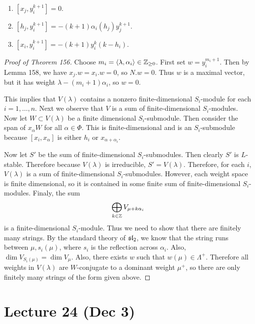 \documentclass[twoside, 10pt]{article}
\begin{document}
    \begin{lem} \begin{enumerate} \item $[x_j, y_i^{k+1}] = 0$.  \item $[h_j,
    y_i^{k+1}] = -(k+1) \alpha_i(h_j) y_j^{k+1}$.  \item $[x_i, y_i^{k+1}] =
    -(k+1) y_i^k(k-h_i)$.  \end{enumerate} \end{lem}

    \begin{proof}[Proof of Theorem 156] Choose $m_i = \langle\lambda, \alpha_i\rangle
        \in \mathbb{Z}_{\geq 0}$. First set $w = y_i^{m_i+1}$. Then by Lemma 158, we
        have $x_j.w = x_i.w = 0$, so $N.w = 0$. Thus $w$ is a maximal vector,
        but it has weight $\lambda - (m_i+1)\alpha_i$, so $w = 0$.

        This implies that $V(\lambda)$ contains a nonzero finite-dimensional
        $S_i$-module for each $i = 1, \ldots, n$. Next we observe that $V$ is a
        sum of finite-dimensional $S_i$-modules. Now let $W \subset V(\lambda)$
        be a finite dimensional $S_i$-submodule. Then consider the span of
        $x_{\alpha}W$ for all $\alpha \in \Phi$. This is finite-dimensional and
        is an $S_i$-submodule because $[x_i, x_{\alpha}]$ is either $h_i$ or
        $x_{\alpha+\alpha_i}$.

        Now let $S'$ be the sum of finite-dimensional $S_i$-submodules. Then
        clearly $S'$ is $L$-stable. Therefore because $V(\lambda)$ is
        irreducible, $S' = V(\lambda)$. Therefore, for each $i$, $V(\lambda)$
        is a sum of finite-dimensional $S_i$-submodules. However, each weight
        space is finite dimensional, so it is contained in some finite sum of
        finite-dimensional $S_i$-modules. Finaly, the sum \[ \bigoplus_{k \in
        \mathbb{Z}} V_{\mu + k\alpha_i} \] is a finite-dimensional $S_i$-module. Thus
        we need to show that there are finitely many strings. By the standard
        theory of $\mathfrak{sl}_2$, we know that the string runs between $\mu,
        s_i(\mu)$, where $s_i$ is the reflection across $\alpha_i$. Also, $\dim
        V_{S_i(\mu)} = \dim V_{\mu}$. Also, there exists $w$ such that $w(\mu)
        \in \Lambda^+$. Therefore all weights in $V(\lambda)$ are $W$-conjugate
        to a dominant weight $\mu^+$, so there are only finitely many strings
        of the form given above.  \end{proof}

    \section{Lecture 24 (Dec 3)}%
\end{document}
